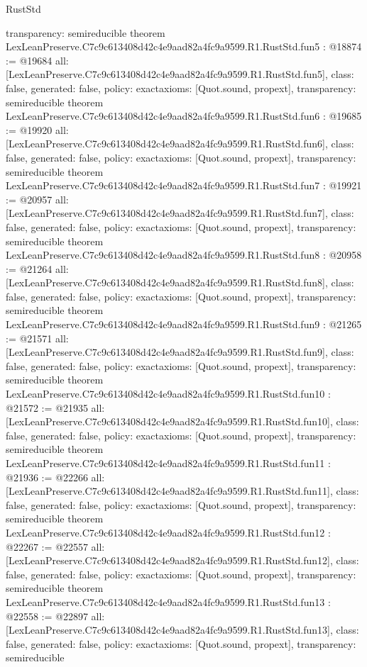 \begin{lexlean}{RustStd}
\begin{coremodule}
{  transparency: semireducible
}
theorem LexLeanPreserve.C7c9c613408d42c4e9aad82a4fc9a9599.R1.RustStd.fun5 : @18874 := @19684 {
  all: [LexLeanPreserve.C7c9c613408d42c4e9aad82a4fc9a9599.R1.RustStd.fun5],
  class: false,
  generated: false,
  policy: exact{axioms: [Quot.sound, propext]},
  transparency: semireducible
}
theorem LexLeanPreserve.C7c9c613408d42c4e9aad82a4fc9a9599.R1.RustStd.fun6 : @19685 := @19920 {
  all: [LexLeanPreserve.C7c9c613408d42c4e9aad82a4fc9a9599.R1.RustStd.fun6],
  class: false,
  generated: false,
  policy: exact{axioms: [Quot.sound, propext]},
  transparency: semireducible
}
theorem LexLeanPreserve.C7c9c613408d42c4e9aad82a4fc9a9599.R1.RustStd.fun7 : @19921 := @20957 {
  all: [LexLeanPreserve.C7c9c613408d42c4e9aad82a4fc9a9599.R1.RustStd.fun7],
  class: false,
  generated: false,
  policy: exact{axioms: [Quot.sound, propext]},
  transparency: semireducible
}
theorem LexLeanPreserve.C7c9c613408d42c4e9aad82a4fc9a9599.R1.RustStd.fun8 : @20958 := @21264 {
  all: [LexLeanPreserve.C7c9c613408d42c4e9aad82a4fc9a9599.R1.RustStd.fun8],
  class: false,
  generated: false,
  policy: exact{axioms: [Quot.sound, propext]},
  transparency: semireducible
}
theorem LexLeanPreserve.C7c9c613408d42c4e9aad82a4fc9a9599.R1.RustStd.fun9 : @21265 := @21571 {
  all: [LexLeanPreserve.C7c9c613408d42c4e9aad82a4fc9a9599.R1.RustStd.fun9],
  class: false,
  generated: false,
  policy: exact{axioms: [Quot.sound, propext]},
  transparency: semireducible
}
theorem LexLeanPreserve.C7c9c613408d42c4e9aad82a4fc9a9599.R1.RustStd.fun10 : @21572 := @21935 {
  all: [LexLeanPreserve.C7c9c613408d42c4e9aad82a4fc9a9599.R1.RustStd.fun10],
  class: false,
  generated: false,
  policy: exact{axioms: [Quot.sound, propext]},
  transparency: semireducible
}
theorem LexLeanPreserve.C7c9c613408d42c4e9aad82a4fc9a9599.R1.RustStd.fun11 : @21936 := @22266 {
  all: [LexLeanPreserve.C7c9c613408d42c4e9aad82a4fc9a9599.R1.RustStd.fun11],
  class: false,
  generated: false,
  policy: exact{axioms: [Quot.sound, propext]},
  transparency: semireducible
}
theorem LexLeanPreserve.C7c9c613408d42c4e9aad82a4fc9a9599.R1.RustStd.fun12 : @22267 := @22557 {
  all: [LexLeanPreserve.C7c9c613408d42c4e9aad82a4fc9a9599.R1.RustStd.fun12],
  class: false,
  generated: false,
  policy: exact{axioms: [Quot.sound, propext]},
  transparency: semireducible
}
theorem LexLeanPreserve.C7c9c613408d42c4e9aad82a4fc9a9599.R1.RustStd.fun13 : @22558 := @22897 {
  all: [LexLeanPreserve.C7c9c613408d42c4e9aad82a4fc9a9599.R1.RustStd.fun13],
  class: false,
  generated: false,
  policy: exact{axioms: [Quot.sound, propext]},
  transparency: semireducible
}
\end{coremodule}
\end{lexlean}
